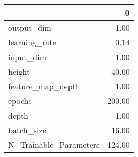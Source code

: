 \begin{tabular}{lr}
\toprule
{} &       0 \\
\midrule
output\_dim             &    1.00 \\
learning\_rate          &    0.14 \\
input\_dim              &    1.00 \\
height                 &   40.00 \\
feature\_map\_depth      &    1.00 \\
epochs                 &  200.00 \\
depth                  &    1.00 \\
batch\_size             &   16.00 \\
N\_Trainable\_Parameters &  124.00 \\
\bottomrule
\end{tabular}
